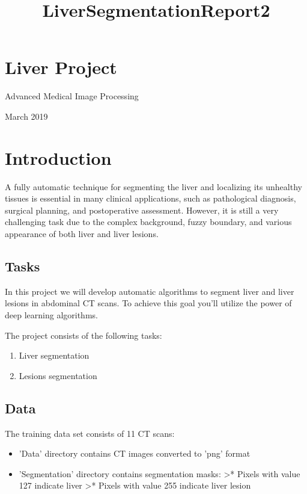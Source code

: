 \documentclass[11pt]{article}
\title{LiverSegmentationReport2}
\providecommand{\tightlist}{%
      \setlength{\itemsep}{0pt}\setlength{\parskip}{0pt}}
\begin{document}
    
    
    \maketitle
    
    

    
    \section{Liver Project}\label{liver-project}

Advanced Medical Image Processing

March 2019

    \section{Introduction}\label{introduction}

A fully automatic technique for segmenting the liver and localizing its
unhealthy tissues is essential in many clinical applications, such as
pathological diagnosis, surgical planning, and postoperative assessment.
However, it is still a very challenging task due to the complex
background, fuzzy boundary, and various appearance of both liver and
liver lesions.

    \subsection{Tasks}\label{tasks}

In this project we will develop automatic algorithms to segment liver
and liver lesions in abdominal CT scans. To achieve this goal you'll
utilize the power of deep learning algorithms.

The project consists of the following tasks:

\begin{enumerate}
\def\labelenumi{\arabic{enumi}.}
\tightlist
\item
  Liver segmentation
\item
  Lesions segmentation
\end{enumerate}

    \subsection{Data}\label{data}

The training data set consists of 11 CT scans:

\begin{itemize}
\tightlist
\item
  'Data' directory contains CT images converted to 'png' format
\item
  'Segmentation' directory contains segmentation masks: \textgreater{}*
  Pixels with value 127 indicate liver \textgreater{}* Pixels with value
  255 indicate liver lesion
\end{itemize}
\end{document}
